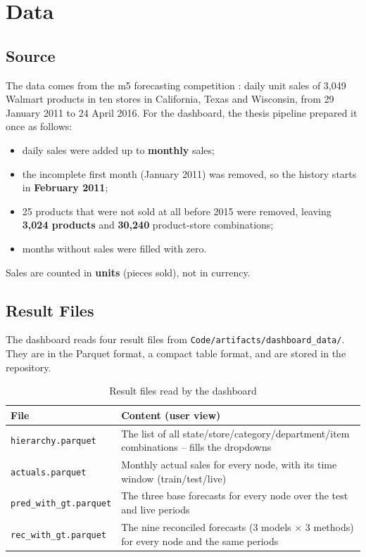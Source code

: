 \section{Data}
\label{sec:specData}

\subsection{Source}

The data comes from the \ac{m5} forecasting competition \cite{Makridakis:2022,Kaggle:M5}: daily unit sales of 3,049 Walmart products in ten stores in California, Texas and Wisconsin, from 29 January 2011 to 24 April 2016. For the dashboard, the thesis pipeline prepared it once as follows:
\begin{itemize}
  \item daily sales were added up to \textbf{monthly} sales;
  \item the incomplete first month (January 2011) was removed, so the history starts in \textbf{February 2011};
  \item 25 products that were not sold at all before 2015 were removed, leaving \textbf{3,024 products} and \textbf{30,240} product-store combinations;
  \item months without sales were filled with zero.
\end{itemize}
Sales are counted in \textbf{units} (pieces sold), not in currency.

\subsection{Result Files}

The dashboard reads four result files from \texttt{Code/artifacts/dashboard\_data/}. They are in the Parquet format, a compact table format, and are stored in the repository.

\begin{table}[H]
\centering
\caption{Result files read by the dashboard}
\label{tab:specFiles}
\small
\begin{tabularx}{\linewidth}{@{}lX@{}}
\toprule
\textbf{File} & \textbf{Content (user view)} \\
\midrule
\texttt{hierarchy.parquet}     & The list of all state/store/category/department/item combinations -- fills the dropdowns \\
\texttt{actuals.parquet}       & Monthly actual sales for every node, with its time window (train/test/live) \\
\texttt{pred\_with\_gt.parquet} & The three base forecasts for every node over the test and live periods \\
\texttt{rec\_with\_gt.parquet}  & The nine reconciled forecasts (3 models $\times$ 3 methods) for every node and the same periods \\
\bottomrule
\end{tabularx}
\end{table}


